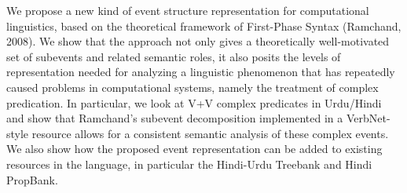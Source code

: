 We propose a new kind of event structure representation for computational linguistics, based on the theoretical framework of First-Phase Syntax (Ramchand, 2008). We show that the approach not only gives a theoretically well-motivated set of subevents and related semantic roles, it also posits the levels of representation needed for analyzing a linguistic phenomenon that has repeatedly caused problems in computational systems, namely the treatment of complex predication. In particular, we look at V+V complex predicates in Urdu/Hindi and show that Ramchand's subevent decomposition implemented in a VerbNet-style resource allows for a consistent semantic analysis of these complex events. We also show how the proposed event representation can be added to existing resources in the language, in particular the Hindi-Urdu Treebank and Hindi PropBank.
